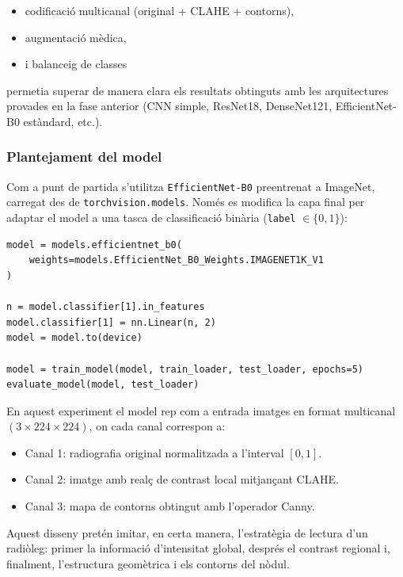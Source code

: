 \documentclass[12pt,a4paper]{article}
\begin{document}
\begin{itemize}
    \item codificació multicanal (original + CLAHE + contorns),
    \item augmentació mèdica,
    \item i balanceig de classes
\end{itemize}

permetia superar de manera clara els resultats obtinguts amb les arquitectures provades en la fase anterior
(CNN simple, ResNet18, DenseNet121, EfficientNet-B0 estàndard, etc.).

\subsubsection{Plantejament del model}

Com a punt de partida s’utilitza \texttt{EfficientNet-B0} preentrenat a ImageNet, carregat des de
\texttt{torchvision.models}. Només es modifica la capa final per adaptar el model a una tasca de
classificació binària (\texttt{label} \(\in \{0,1\}\)):

\begin{lstlisting}[style=mypython]
model = models.efficientnet_b0(
    weights=models.EfficientNet_B0_Weights.IMAGENET1K_V1
)

n = model.classifier[1].in_features
model.classifier[1] = nn.Linear(n, 2)
model = model.to(device)

model = train_model(model, train_loader, test_loader, epochs=5)
evaluate_model(model, test_loader)
\end{lstlisting}

En aquest experiment el model rep com a entrada imatges en format multicanal \((3 \times 224 \times 224)\),
on cada canal correspon a:

\begin{itemize}
    \item Canal 1: radiografia original normalitzada a l’interval \([0,1]\).
    \item Canal 2: imatge amb realç de contrast local mitjançant CLAHE.
    \item Canal 3: mapa de contorns obtingut amb l’operador Canny.
\end{itemize}

Aquest disseny pretén imitar, en certa manera, l’estratègia de lectura d’un radiòleg: primer la informació
d’intensitat global, després el contrast regional i, finalment, l’estructura geomètrica i els contorns del
nòdul.
\end{document}
